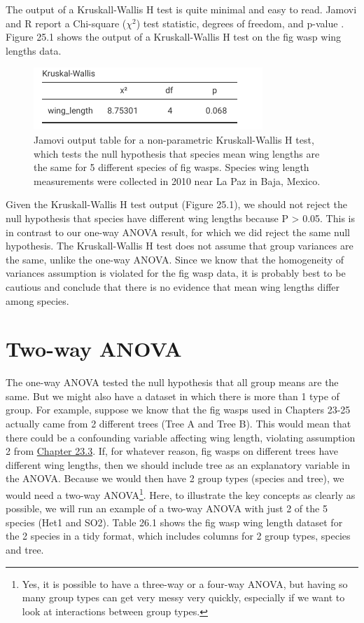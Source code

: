 \documentclass[
]{scrbook}
\begin{document}
The output of a Kruskall-Wallis H test is quite minimal and easy to read.
Jamovi and R report a Chi-square (\(\chi^{2}\)) test statistic, degrees of freedom, and p-value \citep{Jamovi2022, Rproject}.
Figure 25.1 shows the output of a Kruskall-Wallis H test on the fig wasp wing lengths data.

\begin{figure}
\includegraphics[width=0.6\linewidth]{img/jamovi_kruskall-wallis_test} \caption{Jamovi output table for a non-parametric Kruskall-Wallis H test, which tests the null hypothesis that species mean wing lengths are the same for 5 different species of fig wasps. Species wing length measurements were collected in 2010 near La Paz in Baja, Mexico.}\label{fig:unnamed-chunk-118}
\end{figure}

Given the Kruskall-Wallis H test output (Figure 25.1), we should not reject the null hypothesis that species have different wing lengths because P \textgreater{} 0.05.
This is in contrast to our one-way ANOVA result, for which we did reject the same null hypothesis.
The Kruskall-Wallis H test does not assume that group variances are the same, unlike the one-way ANOVA.
Since we know that the homogeneity of variances assumption is violated for the fig wasp data, it is probably best to be cautious and conclude that there is no evidence that mean wing lengths differ among species.

\hypertarget{Chapter_26}{%
\chapter{Two-way ANOVA}\label{Chapter_26}}

The one-way ANOVA tested the null hypothesis that all group means are the same.
But we might also have a dataset in which there is more than 1 type of group.
For example, suppose we know that the fig wasps used in Chapters 23-25 actually came from 2 different trees (Tree A and Tree B).
This would mean that there could be a confounding variable affecting wing length, violating assumption 2 from \protect\hyperlink{assumptions-of-anova}{Chapter 23.3}.
If, for whatever reason, fig wasps on different trees have different wing lengths, then we should include tree as an explanatory variable in the ANOVA.
Because we would then have 2 group types (species and tree), we would need a two-way ANOVA\footnote{Yes, it is possible to have a three-way or a four-way ANOVA, but having so many group types can get very messy very quickly, especially if we want to look at interactions between group types.}.
Here, to illustrate the key concepts as clearly as possible, we will run an example of a two-way ANOVA with just 2 of the 5 species (Het1 and SO2).
Table 26.1 shows the fig wasp wing length dataset for the 2 species in a tidy format, which includes columns for 2 group types, species and tree.
\end{document}
